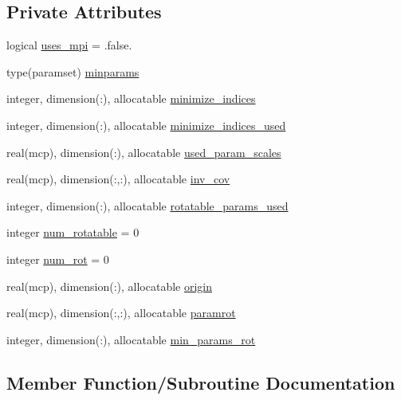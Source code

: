 \subsection*{Private Attributes}
\begin{DoxyCompactItemize}
\item 
logical \mbox{\hyperlink{structminimize_1_1tminimizer_ad24885620be2a8971d453bcef4aaaad0}{uses\+\_\+mpi}} = .false.
\item 
type(paramset) \mbox{\hyperlink{structminimize_1_1tminimizer_a993410de4b37490f36f440b0fba3b1ca}{minparams}}
\item 
integer, dimension(\+:), allocatable \mbox{\hyperlink{structminimize_1_1tminimizer_a31561b98beb39c1af159226b3ebedbbe}{minimize\+\_\+indices}}
\item 
integer, dimension(\+:), allocatable \mbox{\hyperlink{structminimize_1_1tminimizer_a0b291333ed5b559682f422d393418339}{minimize\+\_\+indices\+\_\+used}}
\item 
real(mcp), dimension(\+:), allocatable \mbox{\hyperlink{structminimize_1_1tminimizer_a9f4f5a55427b5f3b75dc5c68ed3ea73d}{used\+\_\+param\+\_\+scales}}
\item 
real(mcp), dimension(\+:,\+:), allocatable \mbox{\hyperlink{structminimize_1_1tminimizer_a2c7768ce72ff58274a2ec4f6b3629163}{inv\+\_\+cov}}
\item 
integer, dimension(\+:), allocatable \mbox{\hyperlink{structminimize_1_1tminimizer_a9c120bd253a7165f50ba96661d82b88e}{rotatable\+\_\+params\+\_\+used}}
\item 
integer \mbox{\hyperlink{structminimize_1_1tminimizer_a8d20f4b33d49474013417e55e945a196}{num\+\_\+rotatable}} = 0
\item 
integer \mbox{\hyperlink{structminimize_1_1tminimizer_abd977d6ec1c172b9201b0bf315f176b4}{num\+\_\+rot}} = 0
\item 
real(mcp), dimension(\+:), allocatable \mbox{\hyperlink{structminimize_1_1tminimizer_a5c5ba6f92fec0270f2eabe77f40d8ef1}{origin}}
\item 
real(mcp), dimension(\+:,\+:), allocatable \mbox{\hyperlink{structminimize_1_1tminimizer_a7ce8b4a389c371ac859441bde89f5ae7}{paramrot}}
\item 
integer, dimension(\+:), allocatable \mbox{\hyperlink{structminimize_1_1tminimizer_a7fe5fc618175b76ed0d433db8882e10b}{min\+\_\+params\+\_\+rot}}
\end{DoxyCompactItemize}


\subsection{Member Function/\+Subroutine Documentation}
\mbox{\label{structminimize_1_1tminimizer_a27d3785b4fccc31f0b16f388479e4c42}} 
